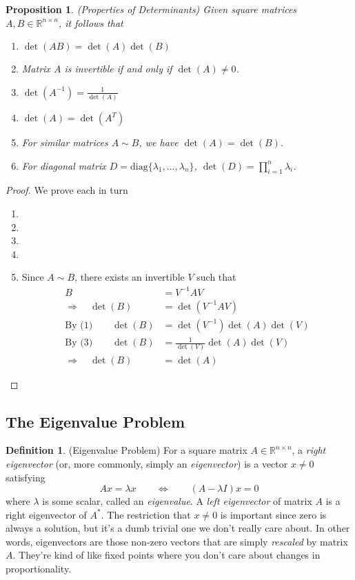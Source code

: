 \documentclass[12pt]{article}
\numberwithin{equation}{section} %
\theoremstyle{plain}
\newtheorem{prop}[thm]{Proposition}
\theoremstyle{definition}
\newtheorem{defn}[thm]{Definition}
\theoremstyle{remark}
\newcommand{\diag}{\text{diag}}
\newcommand{\R}{\mathbb{R}}
\begin{document}
\begin{prop}{\emph{(Properties of Determinants)}}
Given square matrices $A,B\in \R^{n\times n}$, it follows that
\begin{enumerate}
  \item $\det(AB) = \det(A) \det(B)$
  \item Matrix $A$ is invertible if and only if $\det(A) \neq 0$.
  \item $\det(A^{-1}) = \frac{1}{\det(A)}$
  \item $\det(A) = \det(A^T)$
  \item For similar matrices $A\sim B$, we have $\det(A) = \det(B)$.
  \item For diagonal matrix $D=\diag\{\lambda_1,\ldots,\lambda_n\}$,
    $\det(D) = \prod^n_{i=1} \lambda_i$.
\end{enumerate}
\end{prop}
\begin{proof}
We prove each in turn
\begin{enumerate}
  \item
  \item
  \item
  \item
  \item Since $A\sim B$, there exists an invertible $V$ such that
    \begin{align*}
      B &= V^{-1} A V\\
      \Rightarrow\quad
      \det(B) &= \det(V^{-1} A V)\\
      \text{By (1)} \quad\quad
      \det(B) &= \det(V^{-1}) \det(A) \det(V)\\
      \text{By (3)} \quad\quad
      \det(B) &= \frac{1}{\det(V)} \det(A) \det(V)\\
      \Rightarrow\quad
      \det(B) &= \det(A)
    \end{align*}
\end{enumerate}
\end{proof}

\subsection{The Eigenvalue Problem}

\begin{defn}{(Eigenvalue Problem)}
For a square matrix $A \in \R^{n\times n}$, a \emph{right eigenvector}
(or, more commonly, simply an \emph{eigenvector}) is a vector $x\neq 0$
satisfying
\begin{equation}
  Ax = \lambda x
  \qquad \Leftrightarrow \qquad
  (A-\lambda I) x = 0
\end{equation}
where $\lambda$ is some scalar, called an \emph{eigenvalue}.  A
\emph{left eigenvector} of matrix $A$ is a right eigenvector of $A^*$.
The restriction that $x\neq 0$ is important since zero is always a
solution, but it's a dumb trivial one we don't really care about.  In
other words, eigenvectors are those non-zero vectors that are simply
\emph{rescaled} by matrix $A$. They're kind of like fixed points where
you don't care about changes in proportionality.
\end{defn}
\end{document}
